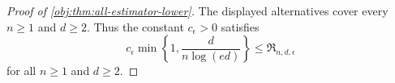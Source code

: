 \begin{proof}[Proof of \cref{obj:thm:all-estimator-lower}]
The displayed alternatives cover every \(n\ge1\) and \(d\ge2\).  Thus the
constant \(c_\epsilon>0\) satisfies
\[
c_\epsilon\min\left\{1,\frac{d}{n\log(ed)}\right\}
\le
\mathfrak R_{n,d,\epsilon}
\]
for all \(n\ge1\) and \(d\ge2\).
\end{proof}
